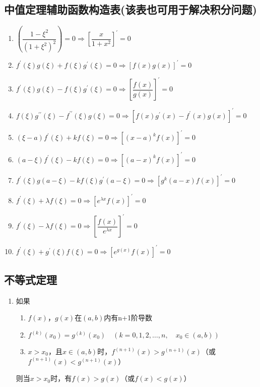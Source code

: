 \documentclass[12pt,a4paper,UTF8]{book}
\begin{document}
\subsection{中值定理辅助函数构造表(该表也可用于解决积分问题)}
\begin{enumerate}
\item $\left(\dfrac{1-\xi^2}{\left(1+\xi^2\right)^2}\right)=0\Rightarrow\left[\dfrac{x}{1+x^2}\right]^\prime=0$
\item $f^\prime\left(\xi\right)g\left(\xi\right)+f\left(\xi\right)g^\prime\left(\xi\right)=0\Rightarrow\left[f\left(x\right)g\left(x\right)\right]^\prime=0$
\item $f^\prime\left(\xi\right)g\left(\xi\right)-f\left(\xi\right)g^\prime\left(\xi\right)=0\Rightarrow\left[\dfrac{f\left(x\right)}{g\left(x\right)}\right]^\prime=0$
\item $f\left(\xi\right)g^{\prime\prime}\left(\xi\right)-f^{\prime\prime}\left(\xi\right)g\left(\xi\right)=0\Rightarrow\left[f\left(x\right)g^\prime\left(x\right)-f^\prime\left(x\right)g\left(x\right)\right]^\prime=0$
\item $\left(\xi-a\right)f^\prime\left(\xi\right)+kf\left(\xi\right)=0\Rightarrow\left[\left(x-a\right)^kf\left(x\right)\right]^\prime=0$
\item $\left(a-\xi\right)f^\prime\left(\xi\right)-kf\left(\xi\right)=0\Rightarrow\left[\left(a-x\right)^kf\left(x\right)\right]^\prime=0$
\item $f^\prime\left(\xi\right)g\left(a-\xi\right)-kf\left(\xi\right)g^\prime\left(a-\xi\right)=0\Rightarrow\left[g^k\left(a-x\right)f\left(x\right)\right]^\prime=0$
\item $f^\prime\left(\xi\right)+\lambda f\left(\xi\right)=0\Rightarrow\left[e^{\lambda x}f\left(x\right)\right]^\prime=0$
\item $f^\prime\left(\xi\right)-\lambda f\left(\xi\right)=0\Rightarrow\left[\dfrac{f\left(x\right)}{e^{\lambda x}}\right]^\prime=0$
\item $f^\prime\left(\xi\right)+g^\prime\left(\xi\right)f\left(\xi\right)=0\Rightarrow\left[e^{g\left(x\right)}f\left(x\right)\right]^\prime=0$
\end{enumerate}

\subsection{不等式定理}
\begin{enumerate}
\item 如果
\begin{enumerate}
\item $f\left(x\right)$，$g\left(x\right)$在$\left(a,b\right)$内有n+1阶导数
\item $f^{\left(k\right)}\left(x_0\right)=g^{\left(k\right)}\left(x_0\right)\quad\left(k=0,1,2,\ldots,n,\quad x_0\in\left(a,b\right)\right)$
\item $x>x_0$，且$x\in\left(a,b\right)$时，$f^{\left(n+1\right)}\left(x\right)>g^{\left(n+1\right)}\left(x\right)$（或$f^{\left(n+1\right)}\left(x\right)<g^{\left(n+1\right)}\left(x\right)$）
\end{enumerate}
则当$x>x_0$时，有$f\left(x\right)>g\left(x\right)$（或$f\left(x\right)<g\left(x\right)$）
\end{enumerate}
\end{document}
